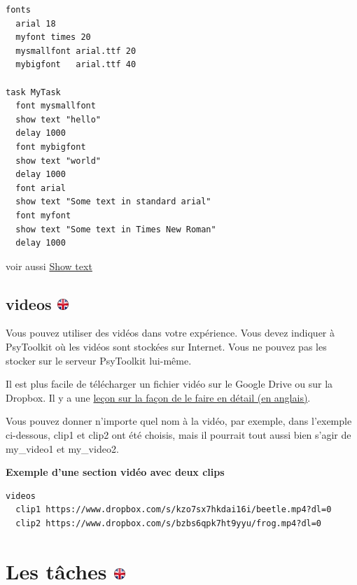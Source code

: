 \documentclass[
]{book}
\begin{document}
\begin{verbatim}
fonts
  arial 18
  myfont times 20
  mysmallfont arial.ttf 20
  mybigfont   arial.ttf 40

task MyTask
  font mysmallfont
  show text "hello"
  delay 1000
  font mybigfont
  show text "world"
  delay 1000
  font arial
  show text "Some text in standard arial"
  font myfont
  show text "Some text in Times New Roman"
  delay 1000
\end{verbatim}

voir aussi \protect\hyperlink{task-show-text}{Show text}

\hypertarget{videos}{%
\subsection[videos ]{\texorpdfstring{videos
\href{https://www.psytoolkit.org/doc3.2.0/syntax.html\#videos}{\protect\includegraphics{img/ukflag.png}}}{videos }}\label{videos}}

Vous pouvez utiliser des vidéos dans votre expérience. Vous devez
indiquer à PsyToolkit où les vidéos sont stockées sur Internet. Vous ne
pouvez pas les stocker sur le serveur PsyToolkit lui-même.

Il est plus facile de télécharger un fichier vidéo sur le Google Drive
ou sur la Dropbox. Il y a une
\href{https://www.psytoolkit.org/lessons/video.html}{leçon sur la façon
de le faire en détail (en anglais)}.

Vous pouvez donner n'importe quel nom à la vidéo, par exemple, dans
l'exemple ci-dessous, clip1 et clip2 ont été choisis, mais il pourrait
tout aussi bien s'agir de my\_video1 et my\_video2.

\textbf{Exemple d'une section vidéo avec deux clips}

\begin{verbatim}
videos
  clip1 https://www.dropbox.com/s/kzo7sx7hkdai16i/beetle.mp4?dl=0
  clip2 https://www.dropbox.com/s/bzbs6qpk7ht9yyu/frog.mp4?dl=0
\end{verbatim}

\hypertarget{les-tuxe2ches}{%
\section[Les tâches ]{\texorpdfstring{Les tâches
\href{https://www.psytoolkit.org/doc3.2.0/syntax.html\#task}{\protect\includegraphics{img/ukflag.png}}}{Les tâches }}\label{les-tuxe2ches}}
\end{document}
